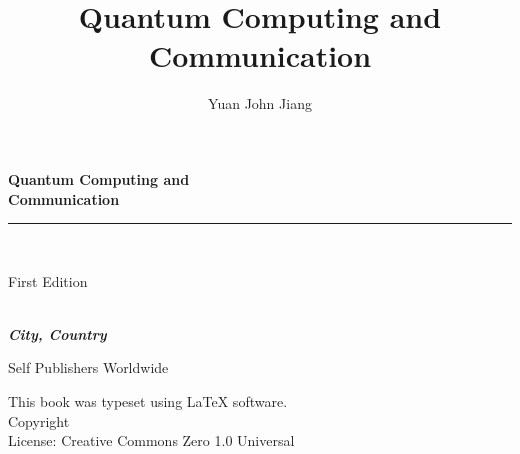 \documentclass{book}
\title{Quantum Computing and Communication}
\author{Yuan John Jiang}
\makeatletter
\newcommand{\booksubtitle}{A Textbook for Computer Science and Engineering Students}
\newcommand{\booklicense}{Creative Commons Zero 1.0 Universal}
\newcommand{\authorsubtitle}{City, Country}
\newcommand{\bookauthor}{\@author}
\makeatother
\begin{document}
\frontmatter



\begin{titlepage}
\begin{flushleft}

\textbf{\fontsize{38}{50}\selectfont Quantum Computing and\\ Communication}

\par\noindent\rule{\textwidth}{4pt}\\


\begin{flushright}
\Large First Edition
\end{flushright}

\vspace{\fill}

\textbf{\large \bookauthor}\\[3.5pt]
\textbf{\large \textit{\authorsubtitle}}

\vspace{\fill}

\begin{center}
\small{Self Publishers Worldwide\\
}
\end{center}

\end{flushleft}
\end{titlepage}
\restoregeometry

\thispagestyle{empty}

\begin{flushleft}
\vspace*{\fill}
This book was typeset using \LaTeX{} software.\\
\vspace{\fill}
Copyright \textcopyright{} \the\year{}  \bookauthor\\
License: \booklicense
\end{flushleft}
\end{document}
